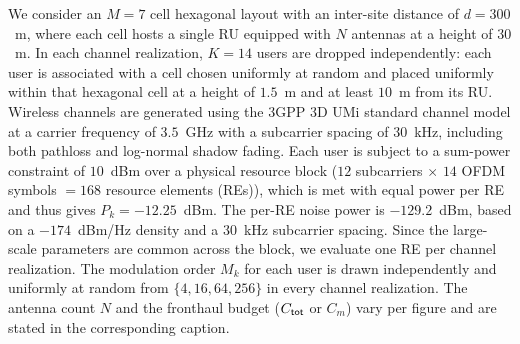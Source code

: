 \documentclass[10pt, twocolumn, comsoc]{IEEEtran}
\begin{document}

We consider an $M = 7$ cell hexagonal layout with an inter-site distance of $d = 300$~m, where each cell hosts a single RU equipped with $N$ antennas at a height of $30$~m.
In each channel realization, $K = 14$ users are dropped independently: each user is associated with a cell chosen uniformly at random and placed uniformly within that hexagonal cell at a height of $1.5$~m and at least $10$~m from its RU.
Wireless channels are generated using the 3GPP 3D UMi standard channel model at a carrier frequency of $3.5$~GHz with a subcarrier spacing of $30$~kHz, including both pathloss and log-normal shadow fading. 
Each user is subject to a sum-power constraint of $10$~dBm over a physical resource block ($12$ subcarriers $\times$ $14$ OFDM symbols $=168$ resource elements (REs)), which is met with equal power per RE and thus gives $P_k = -12.25$~dBm. 
The per-RE noise power is $-129.2$~dBm, based on a $-174$~dBm/Hz density and a $30$~kHz subcarrier spacing.
Since the large-scale parameters are common across the block, we evaluate one RE per channel realization.
The modulation order $M_k$ for each user is drawn independently and uniformly at random from $\{4, 16, 64, 256\}$ in every channel realization. 
The antenna count $N$ and the fronthaul budget ($C_{\sf tot}$ or $C_m$) vary per figure and are stated in the corresponding caption.
\end{document}
